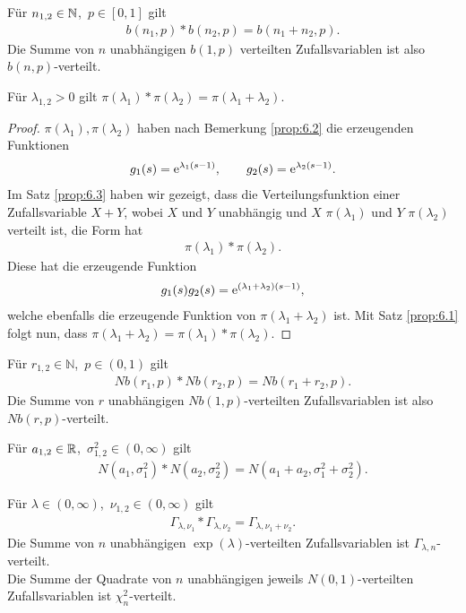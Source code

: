 \begin{bem}[Bemerkungen.]
\label{bem:6.7}
\begin{bemenum}
\item
Für $n_{1,2} \in \mathbb{N}$, $\, p\in [0,1]$ gilt
\begin{align*}
b(n_{1},p)\ast b(n_{2},p) =b(n_{1}+n_{2},p).
\end{align*}
Die Summe von $n$ unabhängigen $b(1,p)$ verteilten Zufallsvariablen ist also
$b(n,p)$-verteilt.
\item
Für $\lambda _{1,2} >0$ gilt
$\pi(\lambda _{1}) \ast \pi(\lambda _{2})= \pi
(\lambda _{1} +\lambda _{2})$.
\begin{proof}
$\pi(\lambda_1),\pi(\lambda_2)$ haben nach Bemerkung \ref{prop:6.2} die
erzeugenden Funktionen
\begin{align*}
g_1(s) = \mathrm{e}^{\lambda_1(s-1)},\qquad g_2(s) = \mathrm{e}^{\lambda_2(s-1)}.
\end{align*}
Im Satz \ref{prop:6.3} haben wir gezeigt, dass die Verteilungsfunktion einer
Zufallsvariable $X+Y$, wobei $X$ und $Y$ unabhängig und $X$ $\pi(\lambda_1)$
und $Y$ $\pi(\lambda_2)$ verteilt ist, die Form hat
\begin{align*}
\pi(\lambda_1)*\pi(\lambda_2).
\end{align*}
Diese hat die erzeugende Funktion
\begin{align*}
g_1(s)g_2(s) = \mathrm{e}^{(\lambda_1+\lambda_2)(s-1)},
\end{align*}
welche ebenfalls  die erzeugende Funktion von
$\pi(\lambda_1+\lambda_2)$ ist. Mit Satz \ref{prop:6.1} folgt nun, dass
$\pi(\lambda_1+\lambda_2)=\pi(\lambda_1)*\pi(\lambda_2)$.\qedhere
\end{proof}
\item
Für $r_{1,2} \in \mathbb{N}$, $\, p \in (0,1)$ gilt
\begin{align*}
Nb(r_{1},p) \ast Nb(r_{2},p)=Nb (r_{1} +r_{2},p).
\end{align*}
Die Summe von $r$ unabhängigen $Nb (1,p)$-verteilten Zufallsvariablen ist also
$Nb(r,p)$-verteilt.
\item
Für $a_{1,2}\in \mathbb{R}$, $\, \sigma^ {2}_{1,2}\in (0,\infty)$ gilt
\begin{align*}
N(a_{1},\sigma^ {2}_{1})\ast N(a_{2},\sigma ^ {2}_{2}) =
N(a_{1}+a_{2}, \sigma ^ {2}_{1} +\sigma ^ {2}_{2}).
\end{align*}
\item
Für $\lambda \in (0,\infty )$, $\, \nu _{1,2} \in (0,\infty)$ gilt
\begin{align*}
\Gamma _{\lambda,\nu _{1}}\ast \Gamma _{\lambda , \nu _{2}} =
\Gamma _{\lambda , \nu _{1} +\nu _{2}}.
\end{align*}
Die Summe von $n$ unabhängigen $\exp (\lambda)$-verteilten Zufallsvariablen ist
$\Gamma_{\lambda , n}$-verteilt. \\
Die Summe der Quadrate von $n$ unabhängigen jeweils $N(0,1)$-verteilten Zufallsvariablen
ist $\chi^ {2}_{n}$-verteilt.\maphere
\end{bemenum}
\end{bem}

